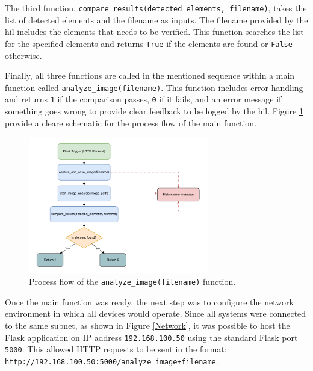 The third function, \texttt{compare\_results(detected\_elements, filename)}, takes the list of detected elements and the filename as inputs. The filename provided by the \gls{hil} includes the elements that needs to be verified. This function searches the list for the specified elements and returns \texttt{True} if the elements are found or \texttt{False} otherwise.

Finally, all three functions are called in the mentioned sequence within a main function called \texttt{analyze\_image(filename)}. This function includes error handling and returns \texttt{1} if the comparison passes, \texttt{0} if it fails, and an error message if something goes wrong to provide clear feedback to be logged by the \gls{hil}. Figure \ref{analyze_image} provide a cleare schematic for the process flow of the main function.


\begin{figure}[!h]
    \centering
    \includegraphics[width=0.7\textwidth]{Figures/diagrams/analyze_image.pdf}
    \caption{Process flow of the \texttt{analyze\_image(filename)} function.}
    \label{analyze_image}
\end{figure}

Once the main function was ready, the next step was to configure the network environment in which all devices would operate. Since all systems were connected to the same subnet, as shown in Figure \ref{Network}, it was possible to host the Flask application on IP address \texttt{192.168.100.50} using the standard Flask port \texttt{5000}. This allowed HTTP requests to be sent in the format: \texttt{http://192.168.100.50:5000/analyze\_image+filename}.

